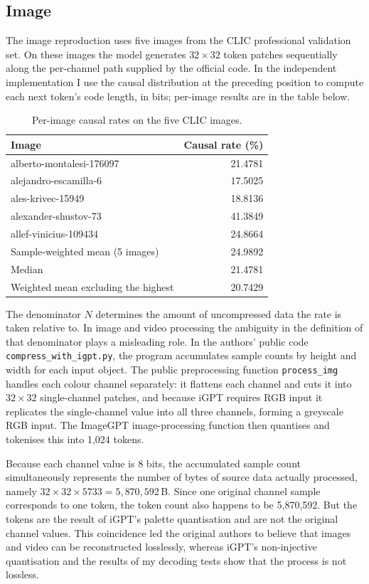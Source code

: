 \documentclass[12pt,a4paper]{article}
\begin{document}
\subsection{Image}

The image reproduction uses five images from the CLIC professional validation set. On these
images the model generates $32\times32$ token patches sequentially along the per-channel path
supplied by the official code. In the independent implementation I use the causal distribution
at the preceding position to compute each next token's code length, in bits; per-image results
are in the table below.

\begin{table}[htbp]\centering\small
\caption{Per-image causal rates on the five CLIC images.}
\begin{tabular}{@{}lr@{}}
\toprule
Image & Causal rate (\%) \\
\midrule
alberto-montalesi-176097 & 21.4781 \\
alejandro-escamilla-6 & 17.5025 \\
ales-krivec-15949 & 18.8136 \\
alexander-shustov-73 & 41.3849 \\
allef-vinicius-109434 & 24.8664 \\
\midrule
Sample-weighted mean (5 images) & 24.9892 \\
Median & 21.4781 \\
Weighted mean excluding the highest & 20.7429 \\
\bottomrule
\end{tabular}
\end{table}

The denominator $N$ determines the amount of uncompressed data the rate is taken relative to.
In image and video processing the ambiguity in the definition of that denominator plays a
misleading role. In the authors' public code \texttt{compress\_with\_igpt.py}, the program
accumulates sample counts by height and width for each input object. The public preprocessing
function \texttt{process\_img} handles each colour channel separately: it flattens each channel
and cuts it into $32\times32$ single-channel patches, and because iGPT requires RGB input it
replicates the single-channel value into all three channels, forming a greyscale RGB input.
The ImageGPT image-processing function then quantises and tokenises this into 1{,}024 tokens.

Because each channel value is 8 bits, the accumulated sample count simultaneously represents
the number of bytes of source data actually processed, namely
$32\times32\times5733 = 5{,}870{,}592$\,B. Since one original channel sample corresponds to one
token, the token count also happens to be 5{,}870{,}592. But the tokens are the result of
iGPT's palette quantisation and are not the original channel values. This coincidence led the
original authors to believe that images and video can be reconstructed losslessly, whereas
iGPT's non-injective quantisation and the results of my decoding tests show that the process is
not lossless.
\end{document}
